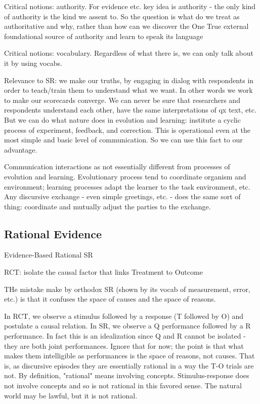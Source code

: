 \documentclass[11pt,twoside]{article}
\begin{document}
Critical notions: authority.  For evidence etc. key idea is authority - the only
kind of authority is the kind we assent to.  So the question is what
do we treat as authoritative and why, rather than how can we discover
the One True external foundational source of authority and learn to
speak its language

Critical notions: vocabulary.  Regardless of what there is, we can
only talk about it by using vocabs.

Relevance to SR: we make our truths, by engaging in dialog with
respondents in order to teach/train them to understand what we want.
In other words we work to make our scorecards converge.  We can never
be sure that researchers and respondents understand each other, have
the same interpretations of qx text, etc.  But we can do what nature
does in evolution and learning: institute a cyclic process of
experiment, feedback, and correction.  This is operational even at the
most simple and basic level of communication.  So we can use this fact
to our advantage.

Communication interactions as not essentially different from processes
of evolution and learning.  Evolutionary process tend to coordinate
organism and environment; learning processes adapt the learner to the
task environment, etc.  Any discursive exchange - even simple
greetings, etc. - does the same sort of thing: coordinate and mutually
adjust the parties to the exchange.

\subsection{Rational Evidence}

Evidence-Based Rational SR

RCT: isolate the causal factor that links Treatment to Outcome

THe mistake make by orthodox SR (shown by its vocab of measurement,
error, etc.) is that it confuses the space of causes and the space of
reasons.

In RCT, we observe a stimulus followed by a response (T followed by O)
and postulate a causal relation.  In SR, we observe a Q performance
followed by a R performance.  In fact this is an idealization since Q
and R cannot be isolated - they are both joint performances.  Ignore
that for now; the point is that what makes them intelligible as
performances is the space of reasons, not causes.  That is, as
discursive episodes they are essentially rational in a way the T-O
trials are not.  By definition, "rational" means involving concepts.
Stimulus-response does not involve concepts and so is not rational in
this favored sense.  The natural world may be lawful, but it is not
rational.
\end{document}

